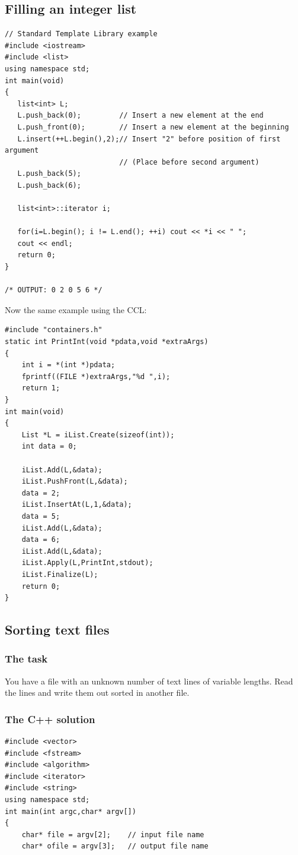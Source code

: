 \documentclass[12pt,a4paper,openany]{memoir} %
\begin{document}
{{\subsection{Filling an integer list}
\begin{verbatim}
// Standard Template Library example
#include <iostream>
#include <list>
using namespace std;
int main(void)
{
   list<int> L;
   L.push_back(0);         // Insert a new element at the end
   L.push_front(0);        // Insert a new element at the beginning
   L.insert(++L.begin(),2);// Insert "2" before position of first argument
                           // (Place before second argument)
   L.push_back(5);
   L.push_back(6);

   list<int>::iterator i;

   for(i=L.begin(); i != L.end(); ++i) cout << *i << " ";
   cout << endl;
   return 0;
}

/* OUTPUT: 0 2 0 5 6 */ 
\end{verbatim}

Now the same example using the CCL:
\begin{verbatim}
#include "containers.h"
static int PrintInt(void *pdata,void *extraArgs)
{
    int i = *(int *)pdata;
    fprintf((FILE *)extraArgs,"%d ",i);
    return 1;
}
int main(void)
{
    List *L = iList.Create(sizeof(int));
    int data = 0;

    iList.Add(L,&data);
    iList.PushFront(L,&data);
    data = 2;
    iList.InsertAt(L,1,&data);
    data = 5;
    iList.Add(L,&data);
    data = 6;
    iList.Add(L,&data);
    iList.Apply(L,PrintInt,stdout);
    iList.Finalize(L);
    return 0;
} 
\end{verbatim}
\subsection{Sorting text files}
\subsubsection{The task}
You have a file with an unknown number of text lines of variable
lengths. Read the lines and write them out sorted in another file.

\subsubsection{The C++ solution}
\begin{verbatim}
#include <vector>
#include <fstream>
#include <algorithm>
#include <iterator>
#include <string>
using namespace std;
int main(int argc,char* argv[])
{
    char* file = argv[2];    // input file name
    char* ofile = argv[3];   // output file name


\end{verbatim}}}
\end{document}
